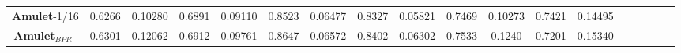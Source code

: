 \documentclass[10pt,twocolumn,letterpaper]{article}
\begin{document}
\begin{table}
\begin{center}
\begin{tabular}{|c|c|c|c|c|c|c|c|c|c|c|c|c|c|c|c|c|c|c|c|c|c|c|c|c|||c|c|c|c|c|c|c|c|||}
\\
\multicolumn{4}{|c|}{\textbf{Amulet}-1/16}
&\multicolumn{2}{|c|}{0.6266}&\multicolumn{2}{|c|}{0.10280}%
&\multicolumn{2}{|c|}{0.6891}&\multicolumn{2}{|c|}{0.09110}%
&\multicolumn{2}{|c|}{0.8523}&\multicolumn{2}{|c|}{0.06477}%
&\multicolumn{2}{|c|}{0.8327}&\multicolumn{2}{|c|}{0.05821}%
&\multicolumn{2}{|c|}{0.7469}&\multicolumn{2}{|c|}{0.10273}%
&\multicolumn{2}{|c|}{0.7421}&\multicolumn{2}{|c|}{0.14495}%
\\
\multicolumn{4}{|c|}{\textbf{Amulet}$_{BPR^{-}}$}
&\multicolumn{2}{|c|}{0.6301}&\multicolumn{2}{|c|}{0.12062}%
&\multicolumn{2}{|c|}{0.6912}&\multicolumn{2}{|c|}{0.09761}%
&\multicolumn{2}{|c|}{0.8647}&\multicolumn{2}{|c|}{0.06572}%
&\multicolumn{2}{|c|}{0.8402}&\multicolumn{2}{|c|}{0.06302}%
&\multicolumn{2}{|c|}{0.7533}&\multicolumn{2}{|c|}{0.1240}%
&\multicolumn{2}{|c|}{0.7201}&\multicolumn{2}{|c|}{0.15340}%

\end{tabular}
\end{center}
\end{table}
\end{document}
